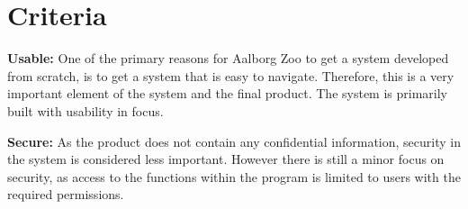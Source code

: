 \section{Criteria} \label{sc:criteria}

\begin{table}[H]
    \centering
    \caption{Checklist for prioritizing design criteria}
    \label{tab:my_label}
\end{table}

\textbf{Usable:} One of the primary reasons for Aalborg Zoo to get a system developed from scratch, is to get a system that is easy to navigate. Therefore, this is a very important element of the system and the final product. The system is primarily built with usability in focus.

\textbf{Secure:} As the product does not contain any confidential information, security in the system is considered less important. However there is still a minor focus on security, as access to the functions within the program is limited to users with the required permissions.

